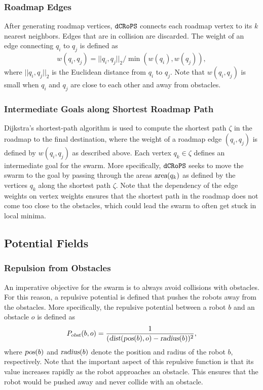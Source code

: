 \documentclass[letterpaper, 10pt, conference]{ieeeconf}
\newcommand{\Acronym}[1]{\ensuremath{{\small{\texttt{#1}}}}}
\newcommand{\Var}[1]{\ensuremath{{\small{\textsl{#1}}}}}
\newcommand{\Name}{\Acronym{dCRoPS}}
\begin{document}


\subsubsection{Roadmap Edges}
After generating roadmap vertices, $\Name$ connects each
roadmap vertex to its $k$ nearest neighbors. Edges that are in
collision are discarded. The weight of an edge connecting $q_i$ to
$q_j$ is defined as
$$
w(q_i, q_j) = ||q_i, q_j||_2 / \min(w(q_i), w(q_j)),
$$
where $||q_i, q_j||_2$ is the Euclidean distance from $q_i$ to $q_j$. Note
that $w(q_i, q_j)$ is small when $q_i$ and $q_j$ are close to each
other and away from obstacles.


\subsubsection{Intermediate Goals along Shortest Roadmap Path}

Dijkstra's shortest-path algorithm is used to compute the shortest path $\zeta$
in the roadmap to the final destination, where the weight of a roadmap edge
$(q_i, q_j)$ is defined by $w(q_i, q_j)$ as described above. Each vertex $q_k
\in \zeta$ defines an intermediate goal for the swarm. More specifically,
$\Name$ seeks to move the swarm to the goal by passing through the areas
$\Var{area}(q_k)$ as defined by the vertices $q_k$ along the shortest path
$\zeta$. Note that the dependency of the edge weights on vertex weights ensures
that the shortest path in the roadmap does not come too close to the obstacles,
which could lead the swarm to often get stuck in local minima.

\subsection{Potential Fields}
\label{sec:PF}

\subsubsection{Repulsion from Obstacles}
\label{sec:PFobst} An imperative objective for
the swarm is to always avoid collisions with obstacles. For this
reason, a repulsive potential is defined that pushes the robots away
from the obstacles. More specifically, the repulsive potential between
a robot $b$ and an obstacle $o$ is defined as
$$ P_\Var{obst}(b, o) = \frac{1}{(\Var{dist}(\Var{pos}(b), o) - \Var{radius}(b))^2},
$$ where $\Var{pos}(b)$ and
$\Var{radius}(b)$ denote the position and radius of the robot $b$, respectively. Note that the
important aspect of this repulsive function is that its value
increases rapidly as the robot approaches an obstacle. This ensures
that the robot would be pushed away and never collide with an obstacle.
\end{document}
